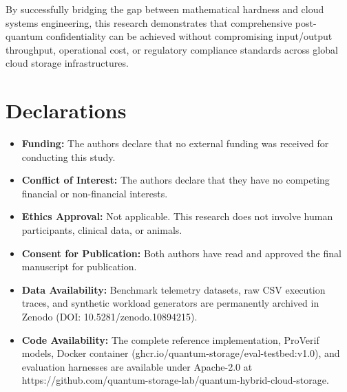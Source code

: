 \documentclass[5p,times]{elsarticle}
\begin{document}
By successfully bridging the gap between mathematical hardness and cloud systems engineering, this research demonstrates that comprehensive post-quantum confidentiality can be achieved without compromising input/output throughput, operational cost, or regulatory compliance standards across global cloud storage infrastructures.


\section*{Declarations}

\begin{itemize}
  \item \textbf{Funding:} The authors declare that no external funding was received for conducting this study.
\end{itemize}

\begin{itemize}
  \item \textbf{Conflict of Interest:} The authors declare that they have no competing financial or non-financial interests.
\end{itemize}

\begin{itemize}
  \item \textbf{Ethics Approval:} Not applicable. This research does not involve human participants, clinical data, or animals.
\end{itemize}

\begin{itemize}
  \item \textbf{Consent for Publication:} Both authors have read and approved the final manuscript for publication.
\end{itemize}

\begin{itemize}
  \item \textbf{Data Availability:} Benchmark telemetry datasets, raw CSV execution traces, and synthetic workload generators are permanently archived in Zenodo (DOI: 10.5281/zenodo.10894215).
\end{itemize}

\begin{itemize}
  \item \textbf{Code Availability:} The complete reference implementation, ProVerif models, Docker container (ghcr.io/quantum-storage/eval-testbed:v1.0), and evaluation harnesses are available under Apache-2.0 at https://github.com/quantum-storage-lab/quantum-hybrid-cloud-storage.
\end{itemize}
\end{document}
